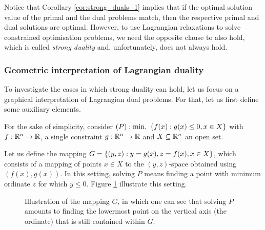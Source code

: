 Notice that Corollary \ref{cor:strong_duals_1} implies that if the optimal solution value of the primal and the dual problems match, then the respective primal and dual solutions are optimal. However, to use Lagrangian relaxations to solve constrained optimisation problems, we need the opposite clause to also hold, which is called \emph{strong duality} and, unfortunately, does not always hold.

\subsubsection{Geometric interpretation of Lagrangian duality}

To investigate the cases in which strong duality can hold, let us focus on a graphical interpretation of Lagrangian dual problems. For that, let us first define some auxiliary elements. 

For the sake of simplicity, consider $(P) : \mathop{\text{min.~}}\left\{ f(x) : g(x) \leq 0, x \in X \right \}$ with $f : \mathbb{R}^n \to \mathbb{R}$, a single constraint $g:\mathbb{R}^n \to \mathbb{R}$ and $X \subseteq \mathbb{R}^n$ an open set.

Let us define the mapping $G = \left\{ (y,z) : y = g(x), z = f(x), x \in X \right \}$, which consists of a mapping of points $x \in X$ to the $(y,z)$-space obtained using $(f(x), g(x))$. In this setting, solving $P$ means finding a point with minimum ordinate $z$ for which $y \leq 0$. Figure \ref{fig:generic_G} illustrate this setting.
%
\begin{figure}[h]
	\caption{Illustration of the mapping $G$, in which one can see that solving $P$ amounts to finding the lowermost point on the vertical axis (the ordinate) that is still contained within $G$.} \label{fig:generic_G}	
\end{figure}
%

